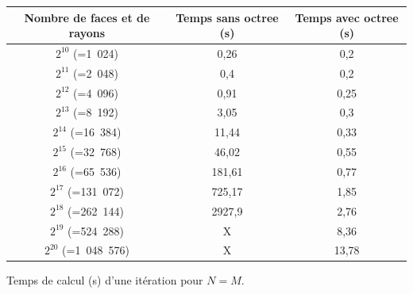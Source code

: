 \begin{tableth}
	\begin{tabular}{| c | c | c |}
		\hline
		Nombre de faces et de rayons & Temps \textbf{sans} \gls{octree} (s) & Temps \textbf{avec} \gls{octree} (s)\\
		  \hline
		  \hline
		   $2^{10}$ (=1~024) & 0,26 &	0,2 \\
		   \hline
		$2^{11}$ (=2~048)  & 0,4	& 0,2 \\
		   \hline
		$2^{12}$ (=4~096) & 0,91	& 0,25\\
		   \hline
		$2^{13}$ (=8~192) & 3,05 &	0,3\\
		   \hline
		$2^{14}$ (=16~384) & 11,44	&0,33\\
		   \hline
		$2^{15}$ (=32~768) & 46,02	&0,55 \\
		     \hline
		    $2^{16}$ (=65~536) & 181,61	& 0,77\\
		   \hline
		$2^{17}$ (=131~072) & 725,17	& 1,85\\
		\hline
		$2^{18}$ (=262~144) & 2927,9 & 2,76 \\
		\hline
		$2^{19}$ (=524~288) & X & 8,36 \\
		\hline
		$2^{20}$ (=1~048~576) & X & 13,78 \\
		\hline
	 \end{tabular}
	\caption{Temps de calcul (s) d'une itération pour $N = M$.}
	\label{tabComplexite}
\end{tableth}


\clearpage

